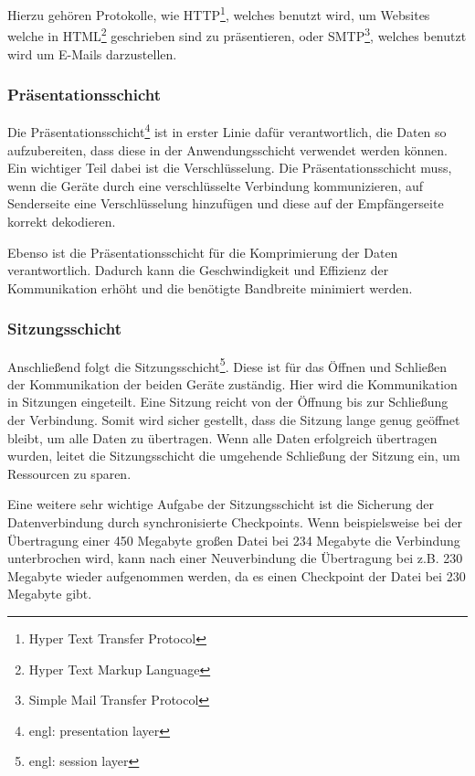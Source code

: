 \documentclass[12pt]{article}
\begin{document}
	Hierzu gehören Protokolle, wie HTTP\footnote{Hyper Text Transfer Protocol}, welches benutzt wird, um Websites welche in HTML\footnote{Hyper Text Markup Language} geschrieben sind zu präsentieren, oder SMTP\footnote{Simple Mail Transfer Protocol}, welches benutzt wird um E-Mails darzustellen.\cite{osi-schichten-cloudflare}\cite{osi-schichten-netzwerkecom}

\subsubsection{Präsentationsschicht}
	Die Präsentationsschicht\footnote{engl: presentation layer} ist in erster Linie dafür verantwortlich, die Daten so aufzubereiten, dass diese in der Anwendungsschicht verwendet werden können. Ein wichtiger Teil dabei ist die Verschlüsselung. Die Präsentationsschicht muss, wenn die Geräte durch eine verschlüsselte Verbindung kommunizieren, auf Senderseite eine Verschlüsselung hinzufügen und diese auf der Empfängerseite korrekt dekodieren. 
	
	Ebenso ist die Präsentationsschicht für die Komprimierung der Daten verantwortlich. Dadurch kann die Geschwindigkeit und Effizienz der Kommunikation erhöht und die benötigte Bandbreite minimiert werden.\cite{osi-schichten-cloudflare}\cite{osi-schichten-netzwerkecom}

\subsubsection{Sitzungsschicht}
	Anschließend folgt die Sitzungsschicht\footnote{engl: session layer}. Diese ist für das Öffnen und Schließen der Kommunikation der beiden Geräte zuständig. Hier wird die Kommunikation in Sitzungen eingeteilt. Eine Sitzung reicht von der Öffnung bis zur Schließung der Verbindung. Somit wird sicher gestellt, dass die Sitzung lange genug geöffnet bleibt, um alle Daten zu übertragen. Wenn alle Daten erfolgreich übertragen wurden, leitet die Sitzungsschicht die umgehende Schließung der Sitzung ein, um Ressourcen zu sparen. 
	
	Eine weitere sehr wichtige Aufgabe der Sitzungsschicht ist die Sicherung der Datenverbindung durch synchronisierte Checkpoints. Wenn beispielsweise bei der Übertragung einer 450 Megabyte großen Datei bei 234 Megabyte die Verbindung unterbrochen wird, kann nach einer Neuverbindung die Übertragung bei z.B. 230 Megabyte wieder aufgenommen werden, da es einen Checkpoint der Datei bei 230 Megabyte gibt.\cite{osi-schichten-cloudflare}\cite{osi-schichten-netzwerkecom}
\end{document}
